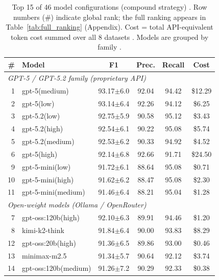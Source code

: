 \documentclass[runningheads]{llncs}
\begin{document}
\begin{table}[!ht]
\centering
\caption{Top 15 of 46 model configurations (compound strategy)%
. Row numbers (\#) indicate global rank; the full ranking appears in Table~\ref{tab:full_ranking} (Appendix). Cost = total API-equivalent token cost summed over all 8 datasets%
. Models are grouped by family%
.}
\label{tab:compound_performance}
\small
\setlength{\tabcolsep}{3pt}
\begin{tabular}{rlcccc}
\toprule
\textbf{\#} & \textbf{Model} & \textbf{F1} & \textbf{Prec.} & \textbf{Recall} & \textbf{Cost} \\
\midrule
\multicolumn{6}{l}{\emph{GPT-5 / GPT-5.2 family (proprietary API)}} \\
\midrule
1 & gpt-5(medium) & 93.17$\pm$6.0 & 92.04 & 94.42 & \$12.29 \\
2 & gpt-5(low) & 93.14$\pm$6.4 & 92.26 & 94.12 & \$6.25 \\
3 & gpt-5.2(low) & 92.75$\pm$5.9 & 90.58 & 95.12 & \$3.43 \\
4 & gpt-5.2(high) & 92.54$\pm$6.1 & 90.22 & 95.08 & \$5.74 \\
5 & gpt-5.2(medium) & 92.53$\pm$6.2 & 90.33 & 94.92 & \$4.52 \\
6 & gpt-5(high) & 92.14$\pm$6.8 & 92.66 & 91.71 & \$24.50 \\
9 & gpt-5-mini(low) & 91.72$\pm$6.1 & 88.64 & 95.08 & \$0.71 \\
10 & gpt-5-mini(high) & 91.62$\pm$6.2 & 88.47 & 95.08 & \$2.30 \\
11 & gpt-5-mini(medium) & 91.46$\pm$6.4 & 88.21 & 95.04 & \$1.28 \\
\midrule
\multicolumn{6}{l}{\emph{Open-weight models (Ollama / OpenRouter)}} \\
\midrule
7 & gpt-oss:120b(high) & 92.10$\pm$6.3 & 89.91 & 94.46 & \$1.20 \\
8 & kimi-k2-think & 91.84$\pm$6.4 & 90.00 & 93.83 & \$8.29 \\
12 & gpt-oss:20b(high) & 91.36$\pm$6.5 & 89.86 & 93.00 & \$0.46 \\
13 & minimax-m2.5 & 91.34$\pm$5.7 & 90.64 & 92.12 & \$3.74 \\
14 & gpt-oss:120b(medium) & 91.26$\pm$7.2 & 90.29 & 92.33 & \$0.38 \\

\end{tabular}
\end{table}
\end{document}
